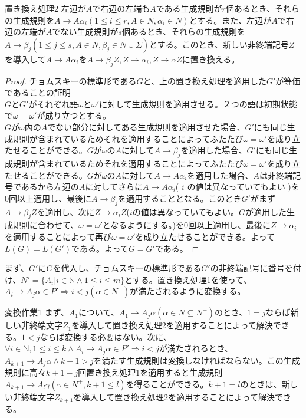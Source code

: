 \documentclass[a4paper]{jarticle}
\begin{document}
\begin{itembox}[l]{置き換え処理2}
左辺が$ A $で右辺の左端も$ A $である生成規則が$ r $個あるとき、それらの生成規則を$ A \to A \alpha _i \left( 1 \leq i \leq r , A \in N , \alpha _i \in N \right)$とする。また、左辺が$ A $で右辺の左端が$ A $でない生成規則が$ s $個あるとき、それらの生成規則を$ A \to \beta _j \left( 1 \leq j \leq s , A \in N , \beta _j \in N \cup \Sigma \right)$とする。このとき、新しい非終端記号$ Z $を導入して$ A \to A \alpha _i $を$ A \to \beta _j Z , Z \to \alpha _i , Z \to \alpha Z$に置き換える。
\end{itembox}
\begin{proof}
チョムスキーの標準形である$G$と、上の置き換え処理を適用した$G'$が等価であることの証明\\
$ G $と$ G' $がそれぞれ語$ \omega $と$ \omega ' $に対して生成規則を適用させる。２つの語は初期状態で$ \omega = \omega ' $が成り立つとする。\\
	$ G $が$ \omega $内の$ A $でない部分に対してある生成規則を適用させた場合、$ G ' $にも同じ生成規則が含まれているためそれを適用することによってふたたび$ \omega = \omega ' $を成り立たせることができる。$ G $が$ \omega $の$ A $に対して$ A \to \beta _j $を適用した場合、$ G ' $にも同じ生成規則が含まれているためそれを適用することによってふたたび$ \omega = \omega ' $を成り立たせることができる。$ G $が$ \omega $の$ A $に対して$ A \to A \alpha _i $を適用した場合、$ A $は非終端記号であるから左辺の$ A $に対してさらに$ A \to A \alpha _i $( $ i $ の値は異なっていてもよい )を$ 0 $回以上適用し、最後に$ A \to \beta _j $を適用することとなる。このとき$ G ' $がまず$ A \to \beta _j Z $を適用し、次に$ Z \to \alpha _i Z $($ i $の値は異なっていてもよい。$ G $が適用した生成規則に合わせて、$ \omega = \omega ' $となるようにする。)を$ 0 $回以上適用し、最後に$ Z \to \alpha _i $を適用することによって再び$ \omega = \omega ' $を成り立たせることができる。よって$ L \left( G \right) = L \left( G ' \right) $である。よって$ G = G ' $である。
\end{proof}
まず、$ G ' $に$ G $を代入し、チョムスキーの標準形である$ G ' $の非終端記号に番号を付け、$ N ' = \bigl\{ A_i | i \in \mathbb{N} \land 1 \leq i \leq m \bigr\} $とする。置き換え処理1を使って、$ A _i \to A _j \alpha \in P ' \Rightarrow i < j \left( \alpha \in N ^+ \right) $が満たされるように変換する。
\begin{itembox}[l]{変換作業1}
まず、$ A _1 $について、$ A _1 \to A _j \alpha \left( \alpha \in N \subseteq N ^+ \right) $のとき、$ 1 = j $ならば新しい非終端文字$ Z _1 $を導入して置き換え処理2を適用することによって解決できる。$ 1 < j $ならば変換する必要はない。次に、$ \forall i \in \mathbb{N} , 1 \leq i \leq k \land A _i \to A _j \alpha \in P ' \Rightarrow i < j $が満たされるとき、$ A _{k + 1} \to A _j \alpha \land k + 1 > j $を満たす生成規則は変換しなければならない。この生成規則に高々$ k + 1 - j $回置き換え処理1を適用すると生成規則$ A _{ k + 1 } \to A _l \gamma \left( \gamma \in N ^+ , k + 1 \leq l \right) $を得ることができる。$ k + 1 = l $のときは、新しい非終端文字$ Z _{ k + 1 } $を導入して置き換え処理2を適用することによって解決できる。
\end{itembox}
\end{document}

